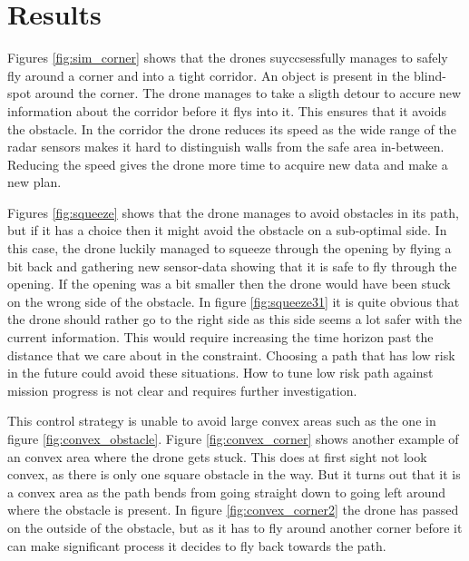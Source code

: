 \section{Results}

Figures \ref{fig:sim_corner} shows that the drones suyccsessfully manages to safely fly around a corner and into a tight corridor. An object is present in the blind-spot around the corner. The drone manages to take a sligth detour to accure new information about the corridor before it flys into it. This ensures that it avoids the obstacle. In the corridor the drone reduces its speed as the wide range of the radar sensors makes it hard to distinguish walls from the safe area in-between. Reducing the speed gives the drone more time to acquire new data and make a new plan. 

Figures \ref{fig:squeeze} shows that the drone manages to avoid obstacles in its path, but if it has a choice then it might avoid the obstacle on a sub-optimal side. In this case, the drone luckily managed to squeeze through the opening by flying a bit back and gathering new sensor-data showing that it is safe to fly through the opening. If the opening was a bit smaller then the drone would have been stuck on the wrong side of the obstacle. In figure \ref{fig:squeeze31} it is quite obvious that the drone should rather go to the right side as this side seems a lot safer with the current information. This would require increasing the time horizon past the distance that we care about in the constraint. Choosing a path that has low risk in the future could avoid these situations. How to tune low risk path against mission progress is not clear and requires further investigation.

This control strategy is unable to avoid large convex areas such as the one in figure \ref{fig:convex_obstacle}. Figure \ref{fig:convex_corner} shows another example of an convex area where the drone gets stuck. This does at first sight not look convex, as there is only one square obstacle in the way. But it turns out that it is a convex area as the path bends from going straight down to going left around where the obstacle is present. In figure \ref{fig:convex_corner2} the drone has passed on the outside of the obstacle, but as it has to fly around another corner before it can make significant process it decides to fly back towards the path. 

